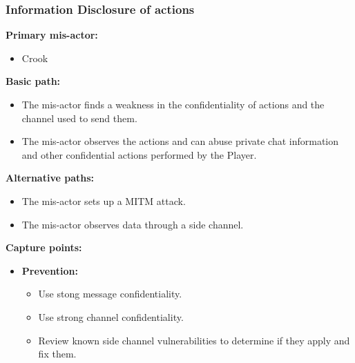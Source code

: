 \documentclass[a4paper,11pt]{report}
\begin{document}
\subsubsection{Information Disclosure of actions}
\textbf{Primary mis-actor:}
\begin{itemize}
\item Crook
\end{itemize}
\textbf{Basic path:}
\begin{itemize}
\item The mis-actor finds a weakness in the confidentiality of actions and the channel used to send them.
\item The mis-actor observes the actions and can abuse private chat information and other confidential actions performed by the Player.
\end{itemize}
\textbf{Alternative paths:}
\begin{itemize}
\item The mis-actor sets up a MITM attack.
\item The mis-actor observes data through a side channel.
\end{itemize}
\textbf{Capture points:}
\begin{itemize}
\item \textbf{Prevention:}
\begin{itemize}
\item Use stong message confidentiality.
\item Use strong channel confidentiality.
\item Review known side channel vulnerabilities to determine if they apply and fix them.
\end{itemize}
\end{itemize}
\end{document}
